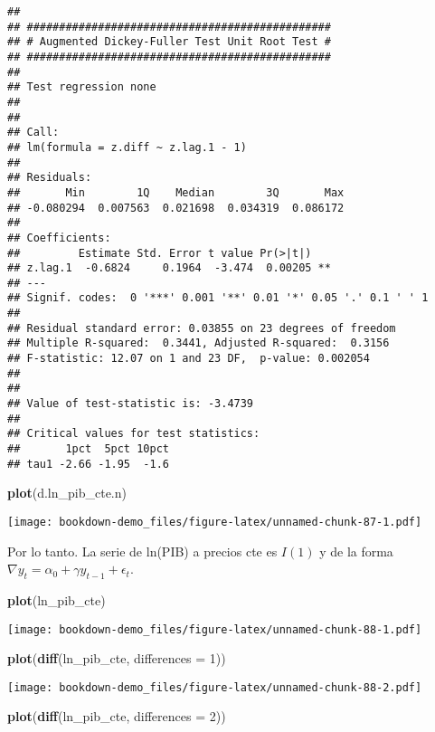 \documentclass[]{book}
\newenvironment{Shaded}{\begin{snugshade}}{\end{snugshade}}
\newcommand{\KeywordTok}[1]{\textcolor[rgb]{0.13,0.29,0.53}{\textbf{#1}}}
\newcommand{\DataTypeTok}[1]{\textcolor[rgb]{0.13,0.29,0.53}{#1}}
\newcommand{\DecValTok}[1]{\textcolor[rgb]{0.00,0.00,0.81}{#1}}
\newcommand{\NormalTok}[1]{#1}
\theoremstyle{definition}
\theoremstyle{definition}
\theoremstyle{definition}
\theoremstyle{remark}
\begin{document}
\begin{verbatim}
## 
## ############################################### 
## # Augmented Dickey-Fuller Test Unit Root Test # 
## ############################################### 
## 
## Test regression none 
## 
## 
## Call:
## lm(formula = z.diff ~ z.lag.1 - 1)
## 
## Residuals:
##       Min        1Q    Median        3Q       Max 
## -0.080294  0.007563  0.021698  0.034319  0.086172 
## 
## Coefficients:
##         Estimate Std. Error t value Pr(>|t|)   
## z.lag.1  -0.6824     0.1964  -3.474  0.00205 **
## ---
## Signif. codes:  0 '***' 0.001 '**' 0.01 '*' 0.05 '.' 0.1 ' ' 1
## 
## Residual standard error: 0.03855 on 23 degrees of freedom
## Multiple R-squared:  0.3441, Adjusted R-squared:  0.3156 
## F-statistic: 12.07 on 1 and 23 DF,  p-value: 0.002054
## 
## 
## Value of test-statistic is: -3.4739 
## 
## Critical values for test statistics: 
##       1pct  5pct 10pct
## tau1 -2.66 -1.95  -1.6
\end{verbatim}

\begin{Shaded}
\begin{Highlighting}[]
\KeywordTok{plot}\NormalTok{(d.ln_pib_cte.n)}
\end{Highlighting}
\end{Shaded}

\texttt{[image: bookdown-demo\_files/figure-latex/unnamed-chunk-87-1.pdf]}

Por lo tanto. La serie de ln(PIB) a precios cte es \(I(1)\) y de la
forma \(\nabla y_t = \alpha_0 + \gamma y_{t-1}+ \epsilon_t\).

\begin{Shaded}
\begin{Highlighting}[]
\KeywordTok{plot}\NormalTok{(ln_pib_cte)}
\end{Highlighting}
\end{Shaded}

\texttt{[image: bookdown-demo\_files/figure-latex/unnamed-chunk-88-1.pdf]}

\begin{Shaded}
\begin{Highlighting}[]
\KeywordTok{plot}\NormalTok{(}\KeywordTok{diff}\NormalTok{(ln_pib_cte, }\DataTypeTok{differences =} \DecValTok{1}\NormalTok{))}
\end{Highlighting}
\end{Shaded}

\texttt{[image: bookdown-demo\_files/figure-latex/unnamed-chunk-88-2.pdf]}

\begin{Shaded}
\begin{Highlighting}[]
\KeywordTok{plot}\NormalTok{(}\KeywordTok{diff}\NormalTok{(ln_pib_cte, }\DataTypeTok{differences =} \DecValTok{2}\NormalTok{))}
\end{Highlighting}
\end{Shaded}
\end{document}
